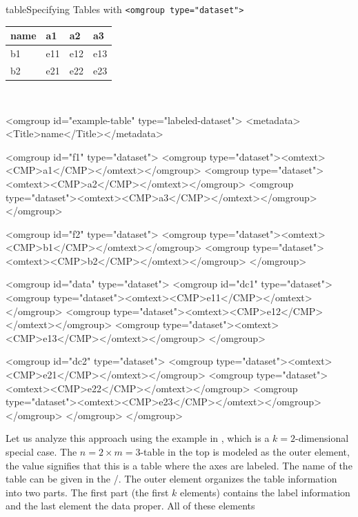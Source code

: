 \begin{myfig}{table}{Specifying Tables with {\tt{<omgroup type="dataset">}}}
  \begin{tabular}{l|lll}
    name &  a1  & a2  & a3\\\hline
    b1  &  e11  & e12 & e13\\         
    b2  &  e21  & e22 & e23\\
  \end{tabular}\\
\begin{scriptsize}
\begin{boxedverbatim}
<omgroup id="example-table" type="labeled-dataset">
 <metadata><Title>name</Title></metadata>

 <omgroup id="f1" type="dataset">
  <omgroup type="dataset"><omtext><CMP>a1</CMP></omtext></omgroup>
  <omgroup type="dataset"><omtext><CMP>a2</CMP></omtext></omgroup>
  <omgroup type="dataset"><omtext><CMP>a3</CMP></omtext></omgroup>
 </omgroup>

 <omgroup id="f2" type="dataset">
  <omgroup type="dataset"><omtext><CMP>b1</CMP></omtext></omgroup>
  <omgroup type="dataset"><omtext><CMP>b2</CMP></omtext></omgroup>
 </omgroup>

 <omgroup id="data" type="dataset">
  <omgroup id="dc1" type="dataset">
   <omgroup type="dataset"><omtext><CMP>e11</CMP></omtext></omgroup>
   <omgroup type="dataset"><omtext><CMP>e12</CMP></omtext></omgroup>
   <omgroup type="dataset"><omtext><CMP>e13</CMP></omtext></omgroup>
  </omgroup>
  
  <omgroup id="dc2" type="dataset">
   <omgroup type="dataset"><omtext><CMP>e21</CMP></omtext></omgroup>
   <omgroup type="dataset"><omtext><CMP>e22</CMP></omtext></omgroup>
   <omgroup type="dataset"><omtext><CMP>e23</CMP></omtext></omgroup>
  </omgroup>
 </omgroup>
</omgroup>
\end{boxedverbatim}
\end{scriptsize}
\end{myfig}
Let us analyze this approach using the example in {}, which is a
$k=2$-dimensional special case. The $n=2\times m=3$-table in the top is modeled as the
outer {} element, the value {}
signifies that this is a table where the axes are labeled. The name of the table can be
given in the {}/{}. The outer {} element
organizes the table information into two parts. The first part (the first $k$ elements)
contains the label information and the last element the data proper. All of these elements

